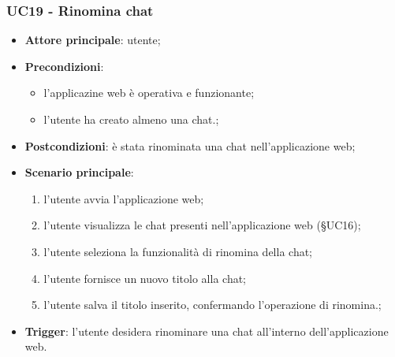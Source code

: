 \documentclass[10pt, a4paper]{article}
\begin{document}
    \subsubsection{UC19 - Rinomina chat}
    \begin{itemize}
        \item \textbf{Attore principale}: utente;
        \item \textbf{Precondizioni}:
        \begin{itemize}
            \item l'applicazine web è operativa e funzionante;
            \item l'utente ha creato almeno una chat.;
        \end{itemize}
        \item \textbf{Postcondizioni}: è stata rinominata una chat nell'applicazione web;
        \item \textbf{Scenario principale}:
            \begin{enumerate}
                \item l'utente avvia l'applicazione web;
                \item l'utente visualizza le chat presenti nell'applicazione web (\S UC16);
                \item l'utente seleziona la funzionalità di rinomina della chat;
                \item l'utente fornisce un nuovo titolo alla chat;
                \item l'utente salva il titolo inserito, confermando l'operazione di rinomina.;
            \end{enumerate}
        \item \textbf{Trigger}: l'utente desidera rinominare una chat all'interno dell'applicazione web.
    \end{itemize}
\end{document}
